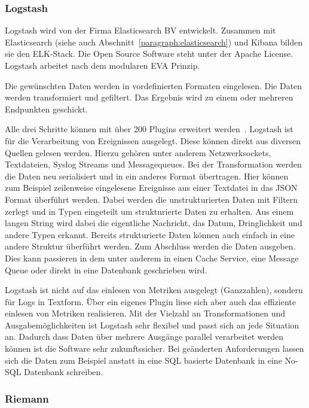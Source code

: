 \subsubsection{Logstash}
Logstash wird von der Firma Elasticsearch BV entwickelt. Zusammen mit
Elasticsearch (siehe auch Abschnitt~\ref{paragraph:elasticsearch}) und
\gls{Kibana} bilden sie den ELK-Stack. Die Open Source Software steht unter der
Apache License. Logstash arbeitet nach dem modularen \gls{EVA} Prinzip.

\begin{outline}
  \1 Die gewünschten Daten werden in vordefinierten Formaten eingelesen.
  \1 Die Daten werden transformiert und gefiltert.
  \1 Das Ergebnis wird zu einem oder mehreren Endpunkten geschickt.
\end{outline}

Alle drei Schritte können mit über 200 Plugins erweitert
werden~\cite{logstash_overview}. Logstash ist für die Verarbeitung von
Ereignissen ausgelegt. Diese können direkt aus diversen Quellen gelesen werden.
Hierzu gehören unter anderem Netzwerksockets, Textdateien, Syslog Streams und
Messagequeues. Bei der Transformation werden die Daten neu serialisiert und in
ein anderes Format übertragen. Hier können zum Beispiel zeilenweise eingelesene
Ereignisse aus einer Textdatei in das \gls{JSON} Format überführt werden. Dabei
werden die unstrukturierten Daten mit Filtern zerlegt und in Typen eingeteilt
um strukturierte Daten zu erhalten. Aus einem langen String wird dabei die
eigentliche Nachricht, das Datum, Dringlichkeit und andere Typen erkannt.
Bereits strukturierte Daten können auch einfach in eine andere Struktur
überführt werden. Zum Abschluss werden die Daten ausgeben. Dies kann passieren
in dem unter anderem in einen Cache Service, eine Message Queue oder direkt
in eine Datenbank geschrieben wird.

Logstash ist nicht auf das einlesen von Metriken ausgelegt (Ganzzahlen),
sondern für Logs in Textform. Über ein eigenes Plugin liese sich aber auch das
effiziente einlesen von Metriken realisieren. Mit der Vielzahl an
Transformationen und Ausgabemöglichkeiten ist Logstash sehr flexibel und passt
sich an jede Situation an. Dadurch dass Daten über mehrere Ausgänge parallel
verarbeitet werden können ist die Software sehr zukunftssicher. Bei geänderten
Anforderungen lassen sich die Daten zum Beispiel anstatt in eine SQL basierte
Datenbank in eine No-SQL Datenbank schreiben.
\tm%

\subsubsection{Riemann}
\tm%


